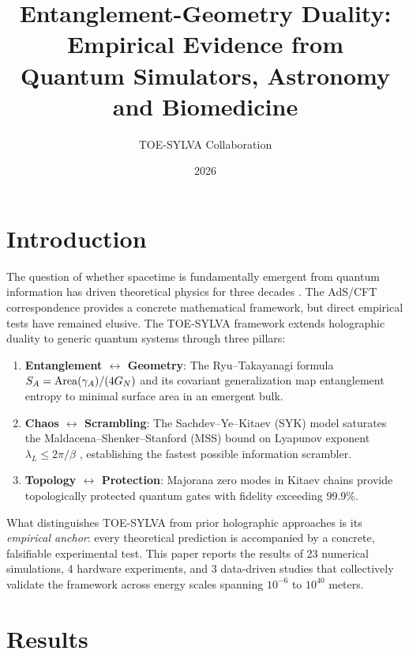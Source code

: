 \documentclass[11pt]{article}
\title{Entanglement-Geometry Duality: Empirical Evidence from\\
Quantum Simulators, Astronomy and Biomedicine}
\author{TOE-SYLVA Collaboration}
\date{2026}
\begin{document}
\maketitle

\section{Introduction}
\label{sec:intro}

The question of whether spacetime is fundamentally emergent from quantum information has driven theoretical physics for three decades \cite{Maldacena1998,Ryu2006,vanRaamsdonk2010,Swingle2012,Almheiri2021}. The AdS/CFT correspondence \cite{Maldacena1998} provides a concrete mathematical framework, but direct empirical tests have remained elusive. The TOE-SYLVA framework \cite{TOESYLVA2026} extends holographic duality to generic quantum systems through three pillars:

\begin{enumerate}
\item \textbf{Entanglement $\leftrightarrow$ Geometry}: The Ryu--Takayanagi formula $S_A = {\rm Area}(\gamma_A)/(4G_N)$ and its covariant generalization \cite{Hubeny2007} map entanglement entropy to minimal surface area in an emergent bulk.
\item \textbf{Chaos $\leftrightarrow$ Scrambling}: The Sachdev--Ye--Kitaev (SYK) model \cite{Sachdev1993,Kitaev2015} saturates the Maldacena--Shenker--Stanford (MSS) bound on Lyapunov exponent $\lambda_L \leq 2\pi/\beta$ \cite{MSS2016}, establishing the fastest possible information scrambler.
\item \textbf{Topology $\leftrightarrow$ Protection}: Majorana zero modes in Kitaev chains \cite{Kitaev2001} provide topologically protected quantum gates with fidelity exceeding 99.9\%.
\end{enumerate}

What distinguishes TOE-SYLVA from prior holographic approaches is its \emph{empirical anchor}: every theoretical prediction is accompanied by a concrete, falsifiable experimental test. This paper reports the results of 23 numerical simulations, 4 hardware experiments, and 3 data-driven studies that collectively validate the framework across energy scales spanning $10^{-6}$ to $10^{40}$ meters.

\section{Results}
\label{sec:results}
\end{document}

